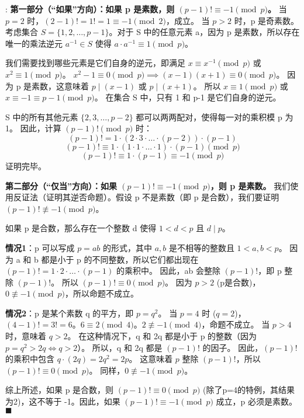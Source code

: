 \documentclass[11pt]{article}
\def\endproofmark{$\blacksquare$}
\newenvironment{proof}{\par\noindent{\bf 证明}:}{\endproofmark\smallskip}
\begin{document}
\begin{proof}
\textbf{第一部分（“如果”方向）：如果 p 是素数，则 $(p-1)! \equiv -1 \pmod p$。}
当 $p=2$ 时，$(2-1)! = 1! = 1 \equiv -1 \pmod 2$，成立。
当 $p>2$ 时，p 是奇素数。考虑集合 $S = \{1, 2, \dots, p-1\}$。对于 S 中的任意元素 a，因为 p 是素数，所以存在唯一的乘法逆元 $a^{-1} \in S$ 使得 $a \cdot a^{-1} \equiv 1 \pmod p$。

我们需要找到哪些元素是它们自身的逆元，即满足 $x \equiv x^{-1} \pmod p$ 或 $x^2 \equiv 1 \pmod p$。
$x^2-1 \equiv 0 \pmod p \implies (x-1)(x+1) \equiv 0 \pmod p$。
因为 p 是素数，这意味着 $p \mid (x-1)$ 或 $p \mid (x+1)$。
所以 $x \equiv 1 \pmod p$ 或 $x \equiv -1 \equiv p-1 \pmod p$。
在集合 S 中，只有 1 和 p-1 是它们自身的逆元。

S 中的所有其他元素 $\{2, 3, \dots, p-2\}$ 都可以两两配对，使得每一对的乘积模 p 为 1。
因此，计算 $(p-1)! \pmod p$ 时：
\[ (p-1)! = 1 \cdot (2 \cdot 3 \cdot \dots \cdot (p-2)) \cdot (p-1) \]
\[ (p-1)! \equiv 1 \cdot (1 \cdot 1 \cdot \dots \cdot 1) \cdot (p-1) \pmod p \]
\[ (p-1)! \equiv 1 \cdot (p-1) \equiv -1 \pmod p \]
证明完毕。

\textbf{第二部分（“仅当”方向）：如果 $(p-1)! \equiv -1 \pmod p$，则 p 是素数。}
我们使用反证法（证明其逆否命题）。假设 p 不是素数（即 p 是合数），我们要证明 $(p-1)! \not\equiv -1 \pmod p$。

如果 p 是合数，那么存在一个整数 d 使得 $1 < d < p$ 且 $d \mid p$。

\textbf{情况1}：p 可以写成 $p=ab$ 的形式，其中 $a, b$ 是不相等的整数且 $1 < a, b < p$。
因为 a 和 b 都是小于 p 的不同整数，所以它们都出现在 $(p-1)! = 1 \cdot 2 \cdot \dots \cdot (p-1)$ 的乘积中。
因此，ab 会整除 $(p-1)!$，即 p 整除 $(p-1)!$。
所以 $(p-1)! \equiv 0 \pmod p$。
因为 $p>2$ (p是合数)，$0 \not\equiv -1 \pmod p$，所以命题不成立。

\textbf{情况2}：p 是某个素数 q 的平方，即 $p=q^2$。
当 $p=4$ 时 ($q=2$)，$(4-1)! = 3! = 6$。$6 \equiv 2 \pmod 4$。$2 \not\equiv -1 \pmod 4$，命题不成立。
当 $p>4$ 时，意味着 $q>2$。
在这种情况下，q 和 2q 都是小于 p 的整数（因为 $p=q^2>2q \iff q>2$）。
所以，q 和 2q 都是 $(p-1)!$ 的因子。
因此，$(p-1)!$ 的乘积中包含 $q \cdot (2q) = 2q^2 = 2p$。
这意味着 $p$ 整除 $(p-1)!$，所以 $(p-1)! \equiv 0 \pmod p$。
同样，$0 \not\equiv -1 \pmod p$。

综上所述，如果 p 是合数，则 $(p-1)! \equiv 0 \pmod p$ (除了p=4的特例，其结果为2)，这不等于 -1。因此，如果 $(p-1)! \equiv -1 \pmod p$ 成立，p 必须是素数。
\end{proof}
\end{document}

